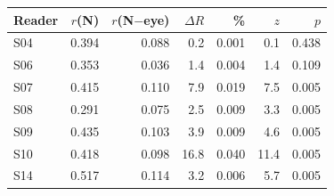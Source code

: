 \begin{tabular}{lrrrrrr}
\toprule
Reader & $r$(N) & $r$(N$-$eye) & $\Delta R$ & \% & $z$ & $p$ \\
\midrule
S04 & 0.394 & 0.088 & 0.2 & 0.001 & 0.1 & 0.438 \\
S06 & 0.353 & 0.036 & 1.4 & 0.004 & 1.4 & 0.109 \\
S07 & 0.415 & 0.110 & 7.9 & 0.019 & 7.5 & 0.005 \\
S08 & 0.291 & 0.075 & 2.5 & 0.009 & 3.3 & 0.005 \\
S09 & 0.435 & 0.103 & 3.9 & 0.009 & 4.6 & 0.005 \\
S10 & 0.418 & 0.098 & 16.8 & 0.040 & 11.4 & 0.005 \\
S14 & 0.517 & 0.114 & 3.2 & 0.006 & 5.7 & 0.005 \\
\bottomrule
\end{tabular}
